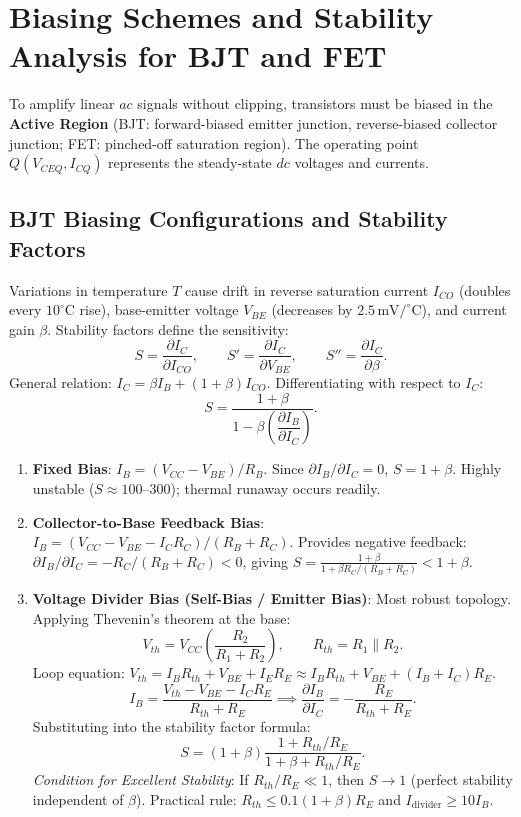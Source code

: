 \documentclass[12pt,a4paper]{article}
\begin{document}
\section{Biasing Schemes and Stability Analysis for BJT and FET}

\begin{tcolorbox}[defbox, title={Operating Point ($Q$-Point) and Stability}]
To amplify linear $ac$ signals without clipping, transistors must be biased in the \textbf{Active Region} (BJT: forward-biased emitter junction, reverse-biased collector junction; FET: pinched-off saturation region). The operating point $Q(V_{CEQ}, I_{CQ})$ represents the steady-state $dc$ voltages and currents.
\end{tcolorbox}

\subsection{BJT Biasing Configurations and Stability Factors}
Variations in temperature $T$ cause drift in reverse saturation current $I_{CO}$ (doubles every $10^\circ\mathrm{C}$ rise), base-emitter voltage $V_{BE}$ (decreases by $2.5\,\mathrm{mV/^\circ C}$), and current gain $\beta$. Stability factors define the sensitivity:
\[
S = \frac{\partial I_C}{\partial I_{CO}},\qquad
S' = \frac{\partial I_C}{\partial V_{BE}},\qquad
S'' = \frac{\partial I_C}{\partial \beta}.
\]
General relation: $I_C = \beta I_B + (1+\beta)I_{CO}$. Differentiating with respect to $I_C$:
\[
S = \frac{1 + \beta}{1 - \beta \left(\dfrac{\partial I_B}{\partial I_C}\right)}.
\]

\begin{enumerate}[leftmargin=1.5em, itemsep=3pt]
  \item \textbf{Fixed Bias}: $I_B = (V_{CC} - V_{BE})/R_B$. Since $\partial I_B/\partial I_C = 0$, $S = 1+\beta$. Highly unstable ($S \approx 100$--$300$); thermal runaway occurs readily.
  \item \textbf{Collector-to-Base Feedback Bias}: $I_B = (V_{CC} - V_{BE} - I_C R_C)/(R_B + R_C)$. Provides negative feedback: $\partial I_B/\partial I_C = -R_C/(R_B+R_C) < 0$, giving $S = \frac{1+\beta}{1 + \beta R_C/(R_B+R_C)} < 1+\beta$.
  \item \textbf{Voltage Divider Bias (Self-Bias / Emitter Bias)}: Most robust topology. Applying Thevenin's theorem at the base:
  \[
  V_{th} = V_{CC}\left(\frac{R_2}{R_1+R_2}\right),\qquad R_{th} = R_1 \parallel R_2.
  \]
  Loop equation: $V_{th} = I_B R_{th} + V_{BE} + I_E R_E \approx I_B R_{th} + V_{BE} + (I_B + I_C)R_E$.
  \[
  I_B = \frac{V_{th} - V_{BE} - I_C R_E}{R_{th} + R_E} \implies \frac{\partial I_B}{\partial I_C} = -\frac{R_E}{R_{th} + R_E}.
  \]
  Substituting into the stability factor formula:
  \[
  S = (1+\beta)\frac{1 + R_{th}/R_E}{1+\beta + R_{th}/R_E}.
  \]
  \textit{Condition for Excellent Stability}: If $R_{th}/R_E \ll 1$, then $S \to 1$ (perfect stability independent of $\beta$). Practical rule: $R_{th} \le 0.1(1+\beta)R_E$ and $I_{\mathrm{divider}} \ge 10 I_B$.
\end{enumerate}
\end{document}
